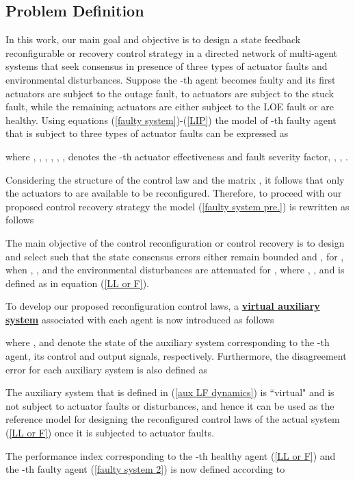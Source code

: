 \documentclass[12pt,draftcls,onecolumn]{IEEEtran}
\begin{document}
\subsection{Problem Definition}\label{subsection 2-E}
 In this work, our main goal and objective is to design a state feedback reconfigurable  or recovery control strategy in a directed network of multi-agent systems that seek consensus in presence of three types of actuator faults and environmental disturbances. 
 Suppose the -th agent becomes faulty and its first  actuators are subject to the outage fault,  to  actuators are subject to the stuck fault, while the remaining  actuators are either subject to the LOE fault or are healthy. Using equations (\ref{faulty system})-(\ref{LIP}) the model of -th faulty agent that is subject to three types of actuator faults can be expressed as
 
where  
, , , 
,  , ,  denotes the -th actuator effectiveness and fault severity factor, , , . \par
Considering the structure of the control law  and the matrix , it follows that only  the actuators  to  are available to be reconfigured. Therefore, to proceed with our proposed control recovery strategy the model (\ref{faulty system pre.}) is rewritten as follows 
 \par
The main objective of the control reconfiguration or control recovery is to design and select     such that the state consensus errors either remain bounded and ,  for , when , , and the environmental disturbances are  attenuated for , where , , and  is defined as in equation (\ref{LL or F}).\par 
 To develop our proposed reconfiguration control laws, a \textbf{\underline{virtual auxiliary system}} associated with each agent is now introduced as follows
 
where ,  and  denote the state of the auxiliary system corresponding to the -th agent,  its control and output signals, respectively.  
Furthermore, the disagreement error for each auxiliary system is also defined as
 
 The auxiliary system that is defined in (\ref{aux LF dynamics}) is ``virtual" and is not subject to actuator faults or disturbances, and hence it can be used as the {reference model} for designing the reconfigured  control laws of the actual  system (\ref{LL or F}) once it is subjected to actuator faults.\par 
 The   performance index corresponding to the -th healthy agent (\ref{LL or F}) and the -th faulty agent (\ref{faulty system 2}) is now defined according to 
 
\end{document}
